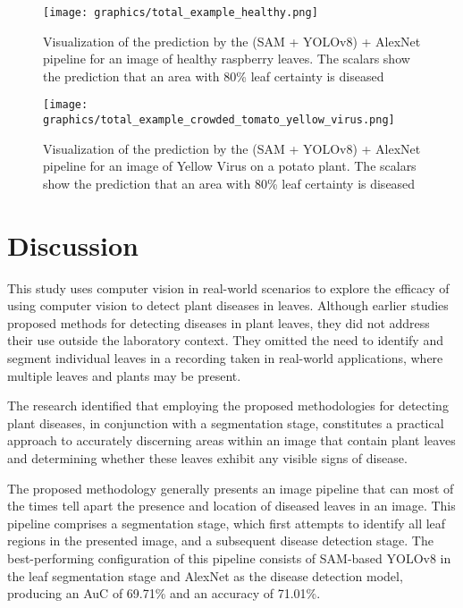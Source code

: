 \documentclass[draft,final]{vutinfth} %
\begin{document}
\begin{figure}
    \centering
    \texttt{[image: graphics/total\_example\_healthy.png]}
    \caption{Visualization of the prediction by the (SAM + YOLOv8) + AlexNet pipeline for an image of healthy raspberry leaves. The scalars show the prediction that an area with 80\% leaf certainty is diseased}
    \label{fig:prediction_example_healthy}
\end{figure}

\begin{figure}
    \centering
    \texttt{[image: graphics/total\_example\_crowded\_tomato\_yellow\_virus.png]}
    \caption{Visualization of the prediction by the (SAM + YOLOv8) + AlexNet pipeline for an image of Yellow Virus on a potato plant. The scalars show the prediction that an area with 80\% leaf certainty is diseased}
    \label{fig:prediction_example_diseased}
\end{figure}

\chapter{Discussion} \label{sec:discussion}
This study uses computer vision in real-world scenarios to explore the efficacy of using computer vision to detect plant diseases in leaves. Although earlier studies proposed methods for detecting diseases in plant leaves, they did not address their use outside the laboratory context. They omitted the need to identify and segment individual leaves in a recording taken in real-world applications, where multiple leaves and plants may be present. 

The research identified that employing the proposed methodologies for detecting plant diseases, in conjunction with a segmentation stage, constitutes a practical approach to accurately discerning areas within an image that contain plant leaves and determining whether these leaves exhibit any visible signs of disease.

The proposed methodology generally presents an image pipeline that can most of the times tell apart the presence and location of diseased leaves in an image. This pipeline comprises a segmentation stage, which first attempts to identify all leaf regions in the presented image, and a subsequent disease detection stage. The best-performing configuration of this pipeline consists of SAM-based YOLOv8 in the leaf segmentation stage and AlexNet as the disease detection model, producing an AuC of 69.71\% and an accuracy of 71.01\%.
\end{document}
